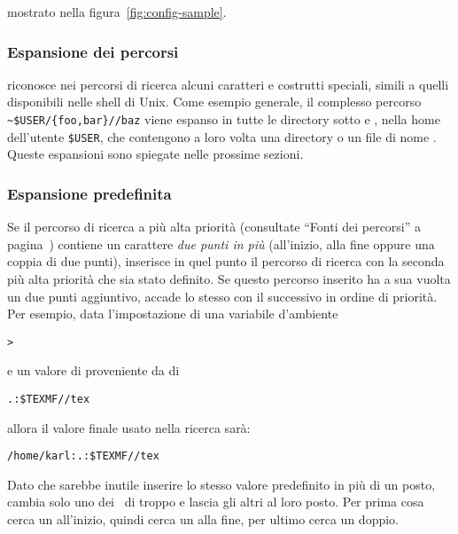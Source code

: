 \documentclass{article}
\begin{document}

\else
mostrato nella figura~\ref{fig:config-sample}.
\fi

\subsubsection{Espansione dei percorsi}
\label{sec:path-expansion}


\KPS{} riconosce nei percorsi di ricerca alcuni caratteri e costrutti
speciali, simili a quelli disponibili nelle shell di Unix. Come esempio
generale, il complesso percorso \verb+~$USER/{foo,bar}//baz+ viene espanso
in tutte le directory sotto  e , nella home dell'utente
\texttt{\$USER}, che contengono a loro volta una directory o un file di
nome . Queste espansioni sono spiegate nelle prossime sezioni.
\subsubsection{Espansione predefinita}
\label{sec:default-expansion}

Se il percorso di ricerca a più alta priorità (consultate ``Fonti dei
percorsi'' a pagina~\pageref{sec:path-sources}) contiene un carattere \emph{due
punti in più} (all'inizio, alla fine oppure una coppia di due
punti), \KPS{} inserisce in quel punto il percorso di ricerca con la
seconda più alta priorità che sia stato definito. Se questo percorso
inserito ha a sua vuolta un due punti aggiuntivo, accade lo stesso con il
successivo in ordine di priorità. Per esempio, data l'impostazione di una
variabile d'ambiente

\begin{alltt}
> 
\end{alltt}
e un valore di  proveniente da  di

\begin{alltt}
  .:\$TEXMF//tex
\end{alltt}
allora il valore finale usato nella ricerca sarà:

\begin{alltt}
  /home/karl:.:\$TEXMF//tex
\end{alltt}

Dato che sarebbe inutile inserire lo stesso valore predefinito in più di
un posto, \KPS{} cambia solo uno dei \samp{:}\ di troppo e lascia gli
altri al loro posto. Per prima cosa cerca un \samp{:} all'inizio, quindi
cerca un \samp{:} alla fine, per ultimo cerca un \samp{:} doppio.
\end{document}
